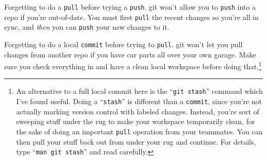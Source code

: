 \begin{compactitem}

\item Forgetting to do a \texttt{pull} before trying a \texttt{push}. git won't
allow you to \texttt{push} into a repo if you're out-of-date. You must first
\texttt{pull} the recent changes so you're all in sync, and \textit{then} you
can \texttt{push} your new changes to it.

\item Forgetting to do a local \texttt{commit} before trying to \texttt{pull}.
git won't let you pull changes from another repo if you have car parts all over
your own garage. Make sure you check everything in and have a clean local
workspace before doing that.\footnote{\label{gitStash} An alternative to a full
local commit here is the ``\texttt{git stash}'' command which I've found
useful. Doing a ``\texttt{stash}'' is different than a \texttt{commit}, since
you're not actually marking version control with labeled changes. Instead,
you're sort of sweeping stuff under the rug to make your workspace temporarily
clean, for the sake of doing an important \texttt{pull} operation from your
teammates. You can then pull your stuff back out from under your rug and
continue. For details, type ``\texttt{man git stash}'' and read carefully.}

\end{compactitem}
